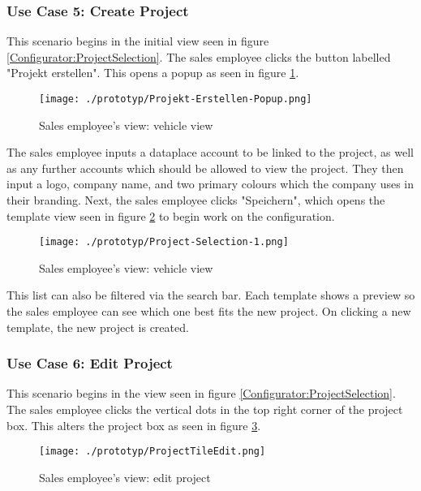 \subsubsection{Use Case 5: Create Project}

This scenario begins in the initial view seen in figure \ref{Configurator:ProjectSelection}. The sales employee clicks the button labelled "Projekt erstellen". This opens a popup as seen in figure \ref{Configurator:CreateProjectPopup}. 

\begin{figure}[ht]
  \centering
  \texttt{[image: ./prototyp/Projekt-Erstellen-Popup.png]}
  \caption{Sales employee's view: vehicle view}
  \label{Configurator:CreateProjectPopup}
\end{figure}

The sales employee inputs a \gls{dataplace} account to be linked to the project, as well as any further accounts which should be allowed to view the project. They then input a logo, company name, and two primary colours which the company uses in their branding. Next, the sales employee clicks "Speichern", which opens the template view seen in figure \ref{Configurator:Template} to begin work on the configuration.

\begin{figure}[ht]
  \centering
  \texttt{[image: ./prototyp/Project-Selection-1.png]}
  \caption{Sales employee's view: vehicle view}
  \label{Configurator:Template}
\end{figure}

This list can also be filtered via the search bar. Each template shows a preview so the sales employee can see which one best fits the new project. On clicking a new template, the new project is created. %


\subsubsection{Use Case 6: Edit Project}

This scenario begins in the view seen in figure \ref{Configurator:ProjectSelection}. The sales employee clicks the vertical dots in the top right corner of the project box. This alters the project box as seen in figure \ref{Configurator:ProjectTileEdit}.

\begin{figure}[ht]
  \centering
  \texttt{[image: ./prototyp/ProjectTileEdit.png]}
  \caption{Sales employee's view: edit project} %
  \label{Configurator:ProjectTileEdit}
\end{figure}

